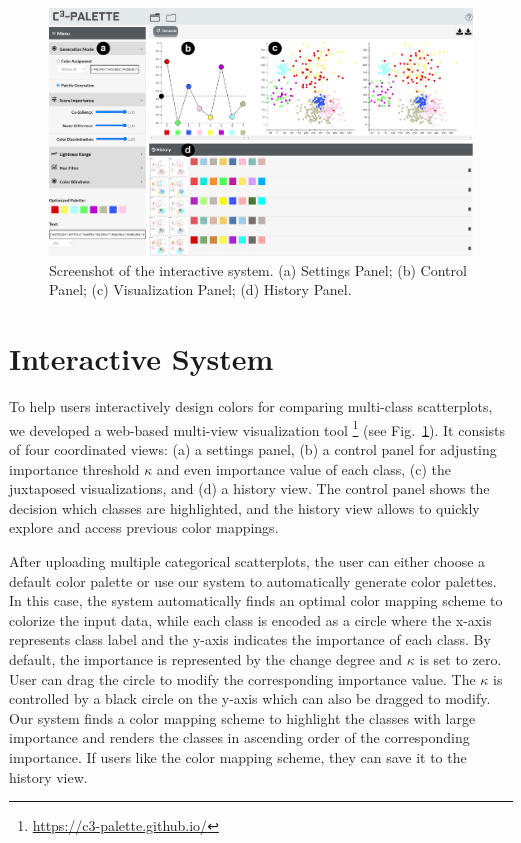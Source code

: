 
\begin{figure}[ht]
\centering
\includegraphics[width=0.8\columnwidth]{figures/interface.pdf}
\caption{Screenshot of the interactive system. (a) Settings Panel; (b) Control Panel; (c) Visualization Panel; (d) History Panel.}
\vspace*{-3mm}
\label{fig:ui}
\end{figure}

\section{Interactive System}
\label{sec:interaction}
To help users interactively design colors for comparing multi-class scatterplots, we developed a web-based multi-view visualization tool \footnote{\small \url{https://c3-palette.github.io/}} (see Fig.~\ref{fig:ui}).
It consists of four coordinated views: (a) a settings panel, (b) a control panel for adjusting importance threshold $\kappa$ and even importance value of each class, (c) the juxtaposed visualizations, and (d) a history view. The control panel shows the decision which classes are highlighted, and the history view allows to quickly explore and access previous color mappings.

After uploading multiple categorical scatterplots, the user can either choose a default color palette or use our system to automatically generate color palettes. In this case, the system automatically finds an optimal color mapping scheme to colorize the input data, while each class is encoded as a circle where the x-axis represents class label and the y-axis indicates the importance of each class. By default, the importance is represented by the change degree and $\kappa$ is set to zero. User can drag the circle to modify the corresponding importance value. The $\kappa$ is controlled by a black circle on the y-axis which can also be dragged to modify. Our system finds a color mapping scheme to highlight the classes with large importance and renders the classes in ascending order of the corresponding importance. If users like the color mapping scheme, they can save it to the history view.

